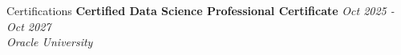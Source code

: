 \documentclass{resume}
\begin{document}
\begin{rSection}{Certifications}
{\bf Certified Data Science Professional \textbar{} Certificate} \hfill {\em Oct 2025 - Oct 2027} \\
{\em Oracle University}
\end{rSection}
\end{document}
